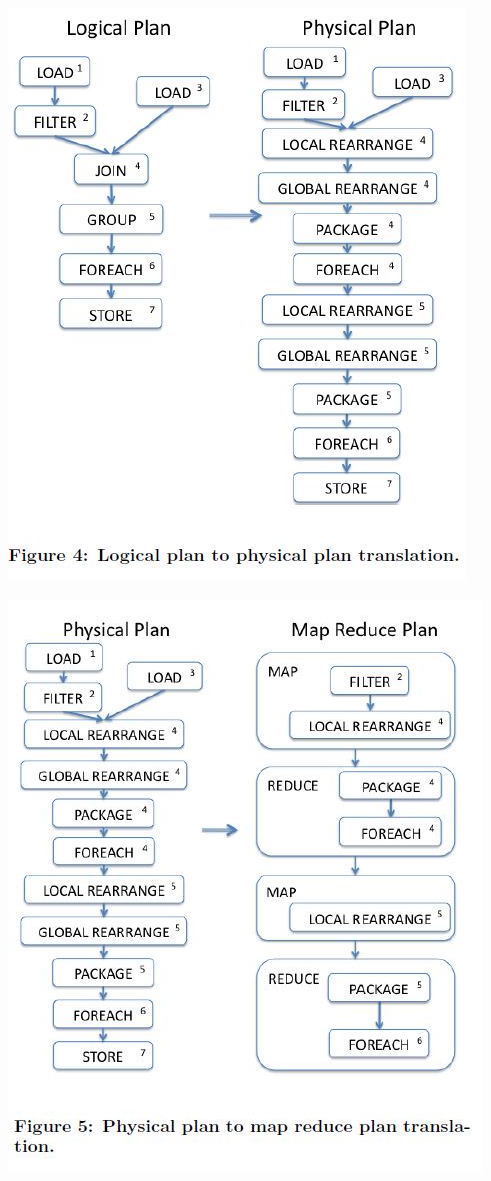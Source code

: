 \begin{frame}
\centerline{\includegraphics[scale=0.45]{Images/Logical_Physical.JPG} }
\let\thefootnote\relax{}
\end{frame}

\begin{frame}
\centerline{\includegraphics[scale=0.45]{Images/Physical_MapReduce.JPG}}
\let\thefootnote\relax{}
\end{frame}

